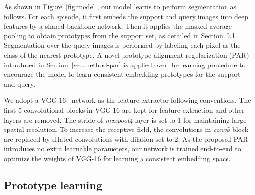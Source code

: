 \documentclass[10pt,twocolumn,letterpaper]{article}
\begin{document}
As shown in Figure~\ref{fig:model}, our model learns to perform segmentation as follows. For each episode, it first embeds the support and query images into deep features by a shared backbone network. Then it applies the masked average pooling  to obtain prototypes from the support set, as detailed in Section~\ref{sec:method-prototype}. Segmentation over the query images is performed by labeling each pixel as the class of the nearest prototype. A novel prototype alignment regularization (PAR) introduced in Section~\ref{sec:method-par} is applied over the learning procedure to encourage the model to learn consistent embedding prototypes for the support and query.

We adopt a VGG-16~\cite{simonyan2014very} network as the feature extractor following conventions. The first 5 convolutional blocks in VGG-16 are kept for feature extraction and other layers are removed. The stride of \textit{maxpool4} layer is set to 1 for maintaining large spatial resolution. To increase the receptive field, the convolutions in \textit{conv5} block are replaced by dilated convolutions with dilation set to 2. As the proposed PAR introduces no extra learnable parameters, our network is trained end-to-end to optimize the weights of VGG-16 for learning a consistent embedding space.

\subsection{Prototype learning}  \label{sec:method-prototype}
\end{document}
